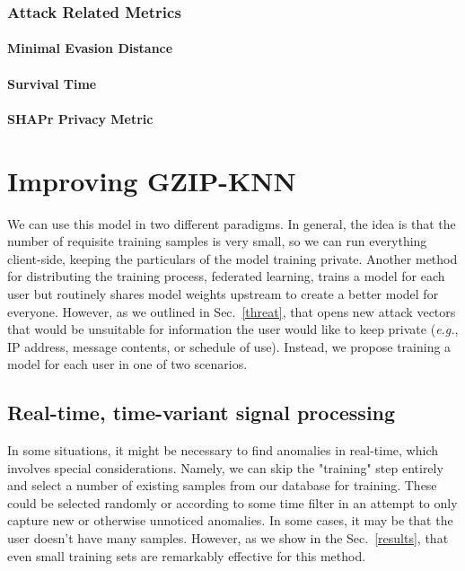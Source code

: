 \documentclass[sigconf]{acmart}
\begin{document}
\subsubsection{Attack Related Metrics}
\paragraph{Minimal Evasion Distance}
\paragraph{Survival Time}
\paragraph{SHAPr Privacy Metric}
\section{Improving GZIP-KNN}
\label{improvements}
We can use this model in two different paradigms. In general, the idea is that the number of requisite training samples is very small, so we can run everything client-side, keeping the particulars of the model training private. Another method for distributing the training process, federated learning, trains a model for each user but routinely shares model weights upstream to create a better model for everyone. However, as we outlined in Sec.~\ref{threat}, that opens new attack vectors that would be unsuitable for information the user would like to keep private (\textit{e.g.}, IP address, message contents, or schedule of use). Instead, we propose training a model for each user in one of two scenarios.
\label{improvements}
\subsection{Real-time, time-variant signal processing}
In some situations, it might be necessary to find anomalies in real-time, which involves special considerations. Namely, we can skip the "training" step entirely and select a number of existing samples from our database for training. These could be selected randomly or according to some time filter in an attempt to only capture new or otherwise unnoticed anomalies. In some cases, it may be that the user doesn't have many samples. However, as we show in the Sec.~\ref{results}, that even small training sets are remarkably effective for this method.
\end{document}
